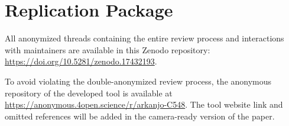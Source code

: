 \documentclass[10pt,conference]{IEEEtran}
\begin{document}
\section*{Replication Package}

All anonymized threads containing the entire review process and interactions with maintainers are available in this Zenodo repository: \href{https://doi.org/10.5281/zenodo.17432193}{https://doi.org/10.5281/zenodo.17432193}.

To avoid violating the double-anonymized review process, the anonymous repository of the developed tool is available at \url{https://anonymous.4open.science/r/arkanjo-C548}. The tool website link and omitted references will be added in the camera-ready version of the paper.



\end{document}
